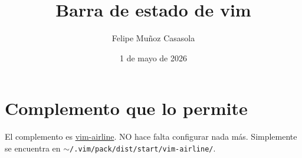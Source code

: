\documentclass{article}
\title{Barra de estado de vim}
\author{Felipe Muñoz Casasola}
\date{1 de mayo de 2026}
\begin{document}
    \maketitle
    \clearpage
    \section{Complemento que lo permite}
    El complemento es \href{https://github.com/vim-airline/vim-airline}{vim-airline}. NO
    hace falta configurar nada más. Simplemente se encuentra en
    \texttt{$\sim$/\-.vim/\-pack/\-dist/\-start/\-vim-airline/}.
\end{document}
